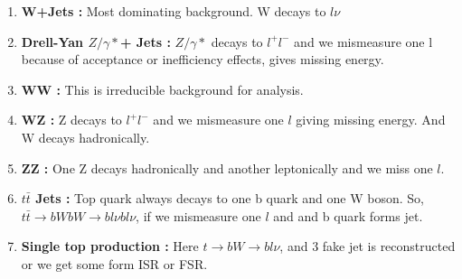 	\begin{enumerate}
		\item {\bf W+Jets :} Most dominating background. W decays to $l\nu $
		\item {\bf Drell-Yan $Z/\gamma*$+ Jets :} $Z/\gamma*$ decays to $l^+l^-$ and we mismeasure one l because of acceptance or inefficiency effects, gives missing energy.
		\item {\bf WW :} This is irreducible background for analysis.
		\item {\bf WZ :} Z decays to $l^+l^-$ and we mismeasure one $l$ giving missing energy. And W decays hadronically.
		\item {\bf ZZ :} One Z decays hadronically and another leptonically and we miss one $l$.
		\item {\bf $t\bar{t}$ Jets :} Top quark always decays to one b quark and one W boson. So, $t\bar{t} \rightarrow bWbW \rightarrow bl\nu bl\nu$, if we mismeasure one $l$ and and b quark forms jet.
		\item {\bf Single top production :} Here $t\rightarrow bW \rightarrow bl\nu $, and 3 fake jet is reconstructed or we get some form ISR or FSR.
	\end{enumerate}

